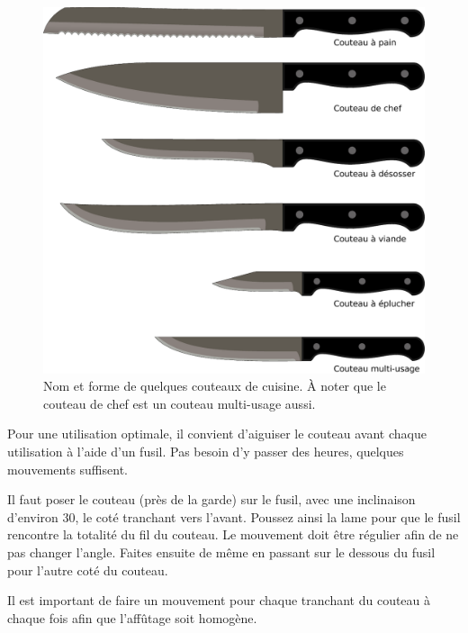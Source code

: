 \documentclass[a4paper,twoside]{report}
\begin{document}
\begin{figure}[htb]
\centering
\includegraphics[width=0.6\linewidth]{figures/couteaux.pdf}
\caption{Nom et forme de quelques couteaux de cuisine. À noter que le couteau de chef est un couteau multi-usage aussi.}
\end{figure}

\begin{remarque}
Pour une utilisation optimale, il convient d'aiguiser le couteau avant chaque utilisation à l'aide d'un fusil. Pas besoin d'y passer des heures, quelques mouvements suffisent.

Il faut poser le couteau (près de la garde) sur le fusil, avec une inclinaison d'environ 30\degre, le coté tranchant vers l'avant. Poussez ainsi la lame pour que le fusil rencontre la totalité du fil du couteau. Le mouvement doit être régulier afin de ne pas changer l'angle. Faites ensuite de même en passant sur le dessous du fusil pour l'autre coté du couteau.

Il est important de faire un mouvement pour chaque tranchant du couteau à chaque fois afin que l'affûtage soit homogène.
\end{remarque}
\end{document}
